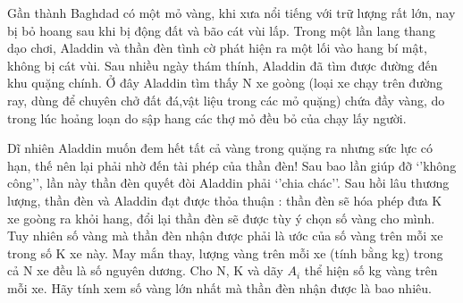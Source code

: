 Gần thành Baghdad có một mỏ vàng, khi xưa nổi tiếng với trữ lượng rất lớn, nay bị bỏ hoang sau khi bị động đất và bão cát vùi lấp. Trong một lần lang thang dạo chơi, Aladdin và thần đèn tình cờ phát hiện ra một lối vào hang bí mật, không bị cát vùi. Sau nhiều ngày thám thính, Aladdin đã tìm được đường đến khu quặng chính. Ở đây Aladdin tìm thấy N xe goòng (loại xe chạy trên đường ray, dùng để chuyên chở đất đá,vật liệu trong các mỏ quặng) chứa đầy vàng, do trong lúc hoảng loạn do sập hang các thợ mỏ đều bỏ của chạy lấy người.

Dĩ nhiên Aladdin muốn đem hết tất cả vàng trong quặng ra nhưng sức lực có hạn, thế nên lại phải nhờ đến tài phép của thần đèn! Sau bao lần giúp đỡ ‘’không công’’, lần này thần đèn quyết đòi Aladdin phải ‘’chia chác’’. Sau hồi lâu thương lượng, thần đèn và Aladdin đạt được thỏa thuận : thần đèn sẽ hóa phép đưa K xe goòng ra khỏi hang, đổi lại thần đèn sẽ được tùy ý chọn số vàng cho mình. Tuy nhiên số vàng mà thần đèn nhận được phải là ước của số vàng trên mỗi xe trong số K xe này. May mắn thay, lượng vàng trên mỗi xe (tính bằng kg) trong cả N xe đều là số nguyên dương.
Cho N, K và dãy $A_{i}$ thể hiện số kg vàng trên mỗi xe. Hãy tính xem số vàng lớn nhất mà thần đèn nhận được là bao nhiêu.